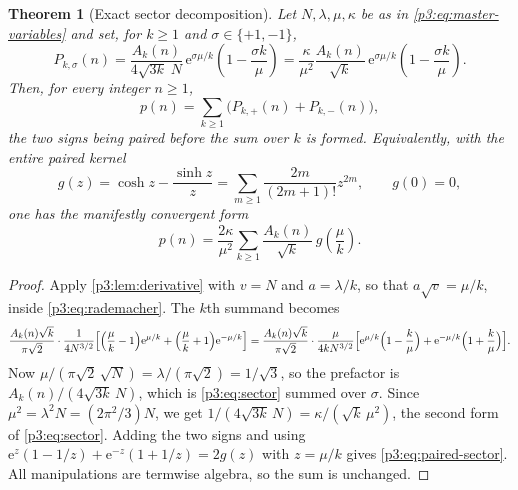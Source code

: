 \documentclass[11pt,a4paper,oneside]{book}
\theoremstyle{plain}
\newtheorem{theorem}{Theorem}[chapter]
\theoremstyle{definition}
\theoremstyle{remark}
\newcommand{\e}{\mathrm{e}}
\begin{document}
\begin{theorem}[Exact sector decomposition]\label{p3:thm:exact-sectors}
Let $N,\lambda,\mu,\kappa$ be as in \cref{p3:eq:master-variables} and set, for $k\ge1$ and
$\sigma\in\{+1,-1\}$,
\begin{equation}\label{p3:eq:sector}
 P_{k,\sigma}(n)
 =\frac{A_{k}(n)}{4\sqrt{3k}\;N}\,
 \e^{\sigma\mu/k}\left(1-\frac{\sigma k}{\mu}\right)
 =\frac{\kappa}{\mu^{2}}\frac{A_{k}(n)}{\sqrt k}\,
 \e^{\sigma\mu/k}\left(1-\frac{\sigma k}{\mu}\right).
\end{equation}
Then, for every integer $n\ge1$,
\begin{equation}\label{p3:eq:sector-sum}
 p(n)=\sum_{k\ge1}\bigl(P_{k,+}(n)+P_{k,-}(n)\bigr),
\end{equation}
the two signs being paired before the sum over $k$ is formed. Equivalently, with the entire paired
kernel
\begin{equation}\label{p3:eq:g-kernel}
 g(z)=\cosh z-\frac{\sinh z}{z}
 =\sum_{m\ge1}\frac{2m}{(2m+1)!}z^{2m},\qquad g(0)=0,
\end{equation}
one has the manifestly convergent form
\begin{equation}\label{p3:eq:paired-sector}
 p(n)=\frac{2\kappa}{\mu^{2}}\sum_{k\ge1}\frac{A_{k}(n)}{\sqrt k}\,
 g\!\left(\frac\mu k\right).
\end{equation}
\end{theorem}

\begin{proof}
Apply \cref{p3:lem:derivative} with $v=N$ and $a=\lambda/k$, so that $a\sqrt v=\mu/k$, inside
\cref{p3:eq:rademacher}. The $k$th summand becomes
\[
\frac{A_{k}(n)\sqrt k}{\pi\sqrt2}\cdot\frac1{4N^{3/2}} \Bigl[\Bigl(\frac\mu k-1\Bigr)\e^{\mu/k}
+\Bigl(\frac\mu k+1\Bigr)\e^{-\mu/k}\Bigr] =\frac{A_{k}(n)\sqrt
k}{\pi\sqrt2}\cdot\frac{\mu}{4kN^{3/2}} \Bigl[\e^{\mu/k}\Bigl(1-\frac k\mu\Bigr)
+\e^{-\mu/k}\Bigl(1+\frac k\mu\Bigr)\Bigr].
\]
Now $\mu/(\pi\sqrt2\,\sqrt N)=\lambda/(\pi\sqrt2)=1/\sqrt3$, so the prefactor is
$A_{k}(n)/(4\sqrt{3k}\,N)$, which is \cref{p3:eq:sector} summed over $\sigma$. Since
$\mu^{2}=\lambda^{2}N=(2\pi^{2}/3)N$, we get $1/(4\sqrt{3k}\,N)=\kappa/(\sqrt k\,\mu^{2})$, the
second form of \cref{p3:eq:sector}. Adding the two signs and using
$\e^{z}(1-1/z)+\e^{-z}(1+1/z)=2g(z)$ with $z=\mu/k$ gives \cref{p3:eq:paired-sector}. All
manipulations are termwise algebra, so the sum is unchanged.
\end{proof}
\end{document}
